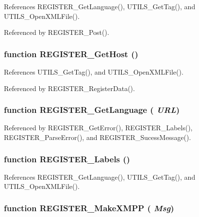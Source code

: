 References REGISTER\_\-GetLanguage(), UTILS\_\-GetTag(), and UTILS\_\-OpenXMLFile().

Referenced by REGISTER\_\-Post().
\subsubsection{\setlength{\rightskip}{0pt plus 5cm}function REGISTER\_\-GetHost ()}\label{register_8js_60682a7fc707db31243bc09b0db76b40}




References UTILS\_\-GetTag(), and UTILS\_\-OpenXMLFile().

Referenced by REGISTER\_\-RegisterData().
\subsubsection{\setlength{\rightskip}{0pt plus 5cm}function REGISTER\_\-GetLanguage ( {\em URL})}\label{register_8js_ccbe8a48655edc3a8b9bfc6fd8e71c12}




Referenced by REGISTER\_\-GetError(), REGISTER\_\-Labels(), REGISTER\_\-ParseError(), and REGISTER\_\-SucessMessage().
\subsubsection{\setlength{\rightskip}{0pt plus 5cm}function REGISTER\_\-Labels ()}\label{register_8js_c489703e14685fd464a2d071d7938d8b}




References REGISTER\_\-GetLanguage(), UTILS\_\-GetTag(), and UTILS\_\-OpenXMLFile().
\subsubsection{\setlength{\rightskip}{0pt plus 5cm}function REGISTER\_\-MakeXMPP ( {\em Msg})}\label{register_8js_7b297505aaea7ef445a5979ad8445a6c}




